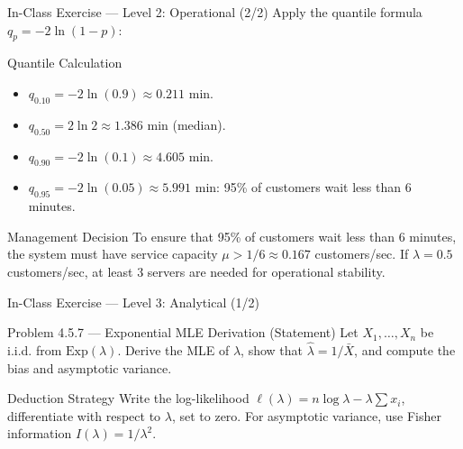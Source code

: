 \documentclass[aspectratio=169,xcolor={dvipsnames,table}]{beamer}
\begin{document}
\begin{frame}{In-Class Exercise --- Level 2: Operational (2/2)}
	\vspace{-0.05cm}
	\scriptsize
	Apply the quantile formula $q_{p} = -2\ln(1-p)$: \pause
	\begin{block}{Quantile Calculation}
		\begin{itemize}\itemsep=0.05cm
			\item $q_{0.10} = -2\ln(0.9) \approx 0.211$ min. \pause
			\item $q_{0.50} = 2\ln 2 \approx 1.386$ min (median). \pause
			\item $q_{0.90} = -2\ln(0.1) \approx 4.605$ min. \pause
			\item $q_{0.95} = -2\ln(0.05) \approx 5.991$ min: 95\% of customers wait less than 6 minutes.
		\end{itemize}
	\end{block}
	\vspace{0.05cm}
	\pause
	\begin{alertblock}{Management Decision}
		\scriptsize
		To ensure that 95\% of customers wait less than 6 minutes, the system must have service capacity $\mu > 1/6 \approx 0.167$ customers/sec. If $\lambda = 0.5$ customers/sec, at least 3 servers are needed for operational stability.
	\end{alertblock}
\end{frame}

\begin{frame}{In-Class Exercise --- Level 3: Analytical (1/2)}
	\vspace{-0.1cm}
	\begin{block}{Problem 4.5.7 --- Exponential MLE Derivation (Statement)}
		Let $X_{1}, \dots, X_{n}$ be i.i.d. from $\text{Exp}(\lambda)$. Derive the MLE of $\lambda$, show that $\hat{\lambda} = 1/\bar{X}$, and compute the bias and asymptotic variance.
	\end{block}
	\vspace{0.1cm}
	\pause
	\begin{alertblock}{Deduction Strategy}
		\scriptsize
		Write the log-likelihood $\ell(\lambda) = n \log \lambda - \lambda \sum x_i$, differentiate with respect to $\lambda$, set to zero. For asymptotic variance, use Fisher information $I(\lambda) = 1/\lambda^{2}$.
	\end{alertblock}
\end{frame}
\end{document}
